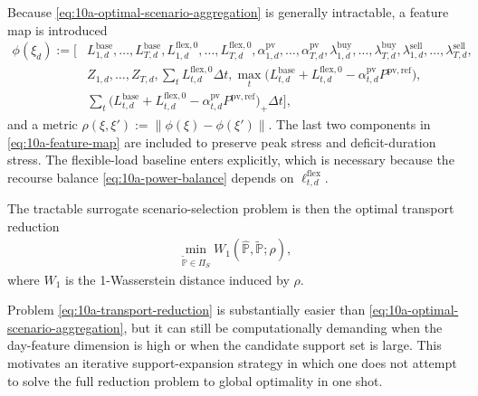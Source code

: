 Because \eqref{eq:10a-optimal-scenario-aggregation} is generally intractable, a feature map is introduced
\begin{align}
\phi(\xi_d) := \Big[
&L^{\mathrm{base}}_{1,d},\dots,L^{\mathrm{base}}_{T,d},
L^{\mathrm{flex},0}_{1,d},\dots,L^{\mathrm{flex},0}_{T,d},
\alpha^{\mathrm{pv}}_{1,d},\dots,\alpha^{\mathrm{pv}}_{T,d},
\lambda^{\mathrm{buy}}_{1,d},\dots,\lambda^{\mathrm{buy}}_{T,d},
\lambda^{\mathrm{sell}}_{1,d},\dots,\lambda^{\mathrm{sell}}_{T,d}, \\
&Z_{1,d},\dots,Z_{T,d},
\sum_t L^{\mathrm{flex},0}_{t,d}\Delta t,
\max_t \big(L^{\mathrm{base}}_{t,d}+L^{\mathrm{flex},0}_{t,d}-\alpha^{\mathrm{pv}}_{t,d}P^{\mathrm{pv,ref}}\big), \\
&\sum_t \big(L^{\mathrm{base}}_{t,d}+L^{\mathrm{flex},0}_{t,d}-\alpha^{\mathrm{pv}}_{t,d}P^{\mathrm{pv,ref}}\big)_+\Delta t
\Big],
\label{eq:10a-feature-map}
\end{align}
and a metric \(\rho(\xi,\xi') := \|\phi(\xi)-\phi(\xi')\|\). The last two components in \eqref{eq:10a-feature-map} are included to preserve peak stress and deficit-duration stress. The flexible-load baseline enters explicitly, which is necessary because the recourse balance \eqref{eq:10a-power-balance} depends on \(\ell^{\mathrm{flex}}_{t,d}\).

The tractable surrogate scenario-selection problem is then the optimal transport reduction
\begin{align}
\min_{\widetilde{\mathbb{P}}\in\Pi_S} W_1(\widehat{\mathbb{P}},\widetilde{\mathbb{P}};\rho),
\label{eq:10a-transport-reduction}
\end{align}
where \(W_1\) is the 1-Wasserstein distance induced by \(\rho\).

Problem \eqref{eq:10a-transport-reduction} is substantially easier than \eqref{eq:10a-optimal-scenario-aggregation}, but it can still be computationally demanding when the day-feature dimension is high or when the candidate support set is large. This motivates an iterative support-expansion strategy in which one does not attempt to solve the full reduction problem to global optimality in one shot.

